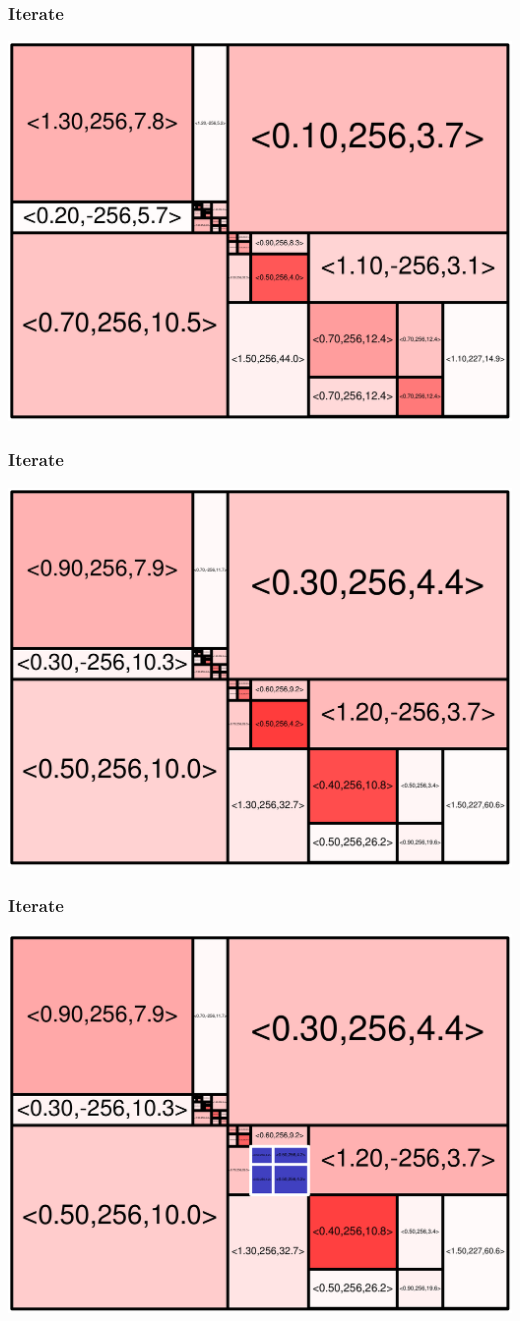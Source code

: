 \begin{frame}
\frametitle{Iterate}\begin{centering}\includegraphics[width=8.5 cm]{remy-graph/graph/test36.pdf}

\end{centering}\end{frame}


\begin{frame}
\frametitle{Iterate}\begin{centering}\includegraphics[width=8.5 cm]{remy-graph/graph/test37.pdf}

\end{centering}\end{frame}


\begin{frame}
\frametitle{Iterate}\begin{centering}\includegraphics[width=8.5 cm]{remy-graph/graph/test38.pdf}

\end{centering}\end{frame}



